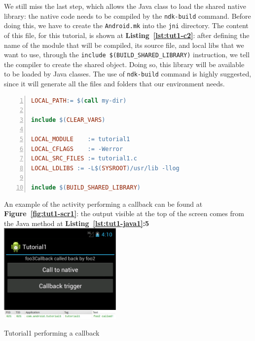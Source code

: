 \documentclass[a4paper,10pt]{article}
\makeatletter
\newenvironment{figurehere}{\def\@captype{figure}\vspace{2ex}}{\vspace{2ex}}
\newcommand{\keyword}[1]{\texttt{#1}}
\newcommand{\reff}[1]{\textbf{Figure~\ref{#1}}}
\newcommand{\refl}[1]{\textbf{Listing~\ref{#1}}}
\makeatother
\begin{document}
\begin{multicols}{2}
We still miss the last step, which allows the Java class to load the shared
native library: the native code needs to be compiled by the \keyword{ndk-build}
command. Before doing this, we have to create the \keyword{Android.mk} into the
\keyword{jni} directory. The content of this file, for this tutorial, is shown
at \refl{lst:tut1-c2}: after defining the name of the module that will be
compiled, its source file, and local libs that we want to use, through the
\keyword{include \$(BUILD\_SHARED\_LIBRARY)} instruction, we tell the compiler
to create the shared object. Doing so, this library will be available to be
loaded by Java classes. The use of \keyword{ndk-build} command is highly
suggested, since it will generate all the files and folders that our environment
needs.

\begin{lstlisting}[language=make,
		   columns=fullflexible,
		   showstringspaces=false,
		   xleftmargin=15pt,
		   frame = l,
		   numbers=left,
		   commentstyle=\color{gray}\upshape,
		   caption=Android.mk for tutorial1.c,
		   label=lst:tut1-c2]
LOCAL_PATH:= $(call my-dir)

include $(CLEAR_VARS)

LOCAL_MODULE    := tutorial1
LOCAL_CFLAGS    := -Werror
LOCAL_SRC_FILES := tutorial1.c
LOCAL_LDLIBS := -L$(SYSROOT)/usr/lib -llog

include $(BUILD_SHARED_LIBRARY)
\end{lstlisting}

An example of the activity performing a callback can be found at
\reff{fig:tut1-scr1}: the output visible at the top of the screen comes from the
Java method at \refl{lst:tut1-java1}\textbf{:5}\\

\begin{figurehere}
 \centering
 \includegraphics[width=6cm]{./figures/tut1-scr1.png}
 \caption{Tutorial1 performing a callback}
 \label{fig:tut1-scr1}
\end{figurehere}


\end{multicols}
\end{document}

